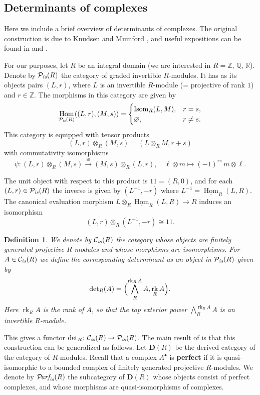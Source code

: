 \documentclass[10pt,a4paper,oneside,draft]{article}
\DeclareMathOperator{\Hom}{Hom}
\DeclareMathOperator{\Isom}{Isom}
\DeclareMathOperator{\rk}{rk}
\newcommand{\QQ}{\mathbb{Q}}
\newcommand{\RR}{\mathbb{R}}
\newcommand{\ZZ}{\mathbb{Z}}
\newcommand{\bone}{1\!\!1}
\newcommand{\Parf}{\mathcal{P}\!\text{\it arf}}
\renewcommand{\det}{\operatorname{det}}
\renewcommand{\emptyset}{\varnothing}
\newcommand{\is}{\text{\it is}}
\newcommand{\iHom}{\underline{\Hom}}
\theoremstyle{myplain}
\theoremstyle{mydefinition}
\newtheorem{definition}[theorem]{Definition}
\numberwithin{equation}{section}
\begin{document}
\begin{appendices}
\section{Determinants of complexes}
\label{app:determinants}

Here we include a brief overview of determinants of complexes. The original
construction is due to Knudsen and Mumford \cite{Knudsen-Mumford-1976}, and
useful expositions can be found in
\cite[Appendix~A]{Gelfand-Kapranov-Zelevinsky-1994} and
\cite[\S 2.1]{Kato-1993}.

For our purposes, let $R$ be an integral domain (we are interested in $R = \ZZ$,
$\QQ$, $\RR$). Denote by $\mathcal{P}_\is (R)$ the category of graded invertible
$R$-modules. It has as its objects pairs $(L,r)$, where $L$ is an invertible
$R$-module (= projective of rank $1$) and $r \in \ZZ$. The morphisms in this
category are given by
\[ \Hom_{\mathcal{P}_\is (R)} ((L,r), (M,s)) = \begin{cases}
    \Isom_R (L,M), & r = s, \\
    \emptyset, & r \ne s.
  \end{cases} \]
This category is equipped with tensor products
$$(L,r) \otimes_R (M,s) = (L\otimes_R M, r + s)$$
with commutativity isomorphisms
\[
  \psi\colon (L,r) \otimes_R (M,s)
  \xrightarrow{\cong}
  (M,s) \otimes_R (L,r),
  \quad
  \ell \otimes m \mapsto (-1)^{rs}\,m\otimes \ell.
\]

The unit object with respect to this product is $\bone = (R,0)$, and for each
$(L,r) \in \mathcal{P}_\is (R)$ the inverse is given by $(L^{-1}, -r)$ where
$L^{-1} = \iHom_R (L,R)$. The canonical evaluation morphism
$L \otimes_R \iHom_R (L,R) \to R$ induces an isomorphism
$$(L,r) \otimes_R (L^{-1}, -r) \cong \bone.$$

\begin{definition}
  \label{dfn:determinant-of-projective-fg-module}
  We denote by $\mathcal{C}_\is (R)$ the category whose objects are finitely
  generated projective $R$-modules and whose morphisms are isomorphisms.  For
  $A \in \mathcal{C}_\is (R)$ we define the corresponding determinant as an
  object in $\mathcal{P}_\is (R)$ given by
  $$\det_R (A) = \Bigl(\bigwedge^{\rk_R A}_R A, \rk_R A\Bigr).$$
  Here $\rk_R A$ is the rank of $A$, so that the top exterior power
  $\bigwedge^{\rk_R A}_R A$ is an invertible $R$-module.
\end{definition}

This gives a functor $\det_R\colon \mathcal{C}_\is (R) \to \mathcal{P}_\is (R)$.
The main result of \cite[Chapter~I]{Knudsen-Mumford-1976} is that this
construction can be generalized as follows. Let $\mathbf{D} (R)$ be the derived
category of the category of $R$-modules. Recall that a complex $A^\bullet$ is
\textbf{perfect} if it is quasi-isomorphic to a bounded complex of finitely
generated projective $R$-modules. We denote by $\Parf_\is (R)$ the subcategory
of $\mathbf{D} (R)$ whose objects consist of perfect complexes, and whose
morphisms are quasi-isomorphisms of complexes.


\end{appendices}
\end{document}
